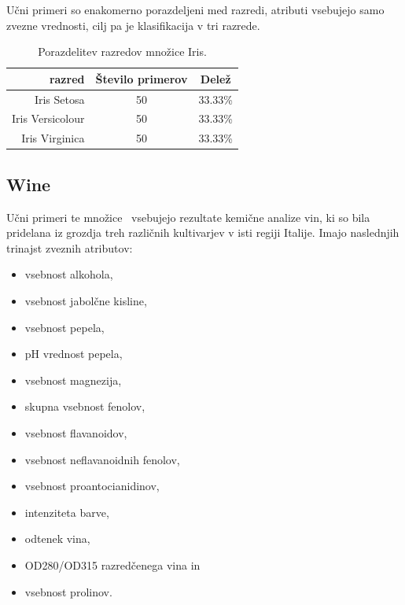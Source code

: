 \documentclass[a4paper,12pt,openright]{book}
\begin{document}
    Učni primeri so enakomerno porazdeljeni med razredi, atributi vsebujejo samo zvezne vrednosti, cilj pa je klasifikacija v tri razrede.

    \begin{table}[H]
        \centering
        \begin{tabular}{||rcc||}
            \hline
            razred           & Število primerov & Delež   \\ \hline
            Iris Setosa      & 50               & 33.33\% \\ \hline
            Iris Versicolour & 50               & 33.33\% \\ \hline
            Iris Virginica   & 50               & 33.33\% \\ \hline
        \end{tabular}
        \caption{Porazdelitev razredov množice Iris.}
        \label{tab:iris_opis}
    \end{table}

    \subsection{Wine}\label{subsec:wine}
    Učni primeri te množice~\cite{misc_wine_109} vsebujejo rezultate kemične analize vin, ki so bila pridelana iz grozdja
    treh različnih kultivarjev v isti regiji Italije.
    Imajo naslednjih trinajst zveznih atributov:
    \begin{itemize}
        \item vsebnost alkohola,
        \item vsebnost jabolčne kisline,
        \item vsebnost pepela,
        \item pH vrednost pepela,
        \item vsebnost magnezija,
        \item skupna vsebnost fenolov,
        \item vsebnost flavanoidov,
        \item vsebnost neflavanoidnih fenolov,
        \item vsebnost proantocianidinov,
        \item intenziteta barve,
        \item odtenek vina,
        \item OD280/OD315 razredčenega vina in
        \item vsebnost prolinov.
    \end{itemize}
\end{document}
